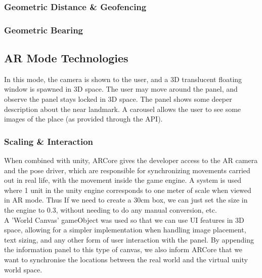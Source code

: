 \subsubsection{Geometric Distance \& Geofencing}
\subsubsection{Geometric Bearing}




\subsection{AR Mode Technologies}
In this mode, the camera is shown to the user, and a 3D translucent floating window is spawned in 3D space.
The user may move around the panel, and observe the panel stays locked in 3D space. The panel shows
some deeper description about the near landmark. A carousel allows the user to see some images of the place
 (as provided through the API). 


\subsubsection{Scaling \& Interaction}
When combined with unity, ARCore gives the developer access to the AR camera and the pose driver, which are responsible for synchronizing movements 
carried out in real life, with the movement inside the game engine. A system is used where 1 unit in the unity engine corresponds to one meter of scale when 
viewed in AR mode. Thus If we need to create a 30cm box, we can just set the size in the engine to 0.3, without needing to do any manual conversion, etc.\\

 A 'World Canvas' gameObject was used so that we can use UI features in 3D space, allowing for a simpler implementation when handling image placement, text sizing, 
 and any other form of user interaction with the panel. By appending the information panel to this type of canvas, we also inform ARCore that we want to synchronise 
 the locations between the real world and the virtual unity world space.

